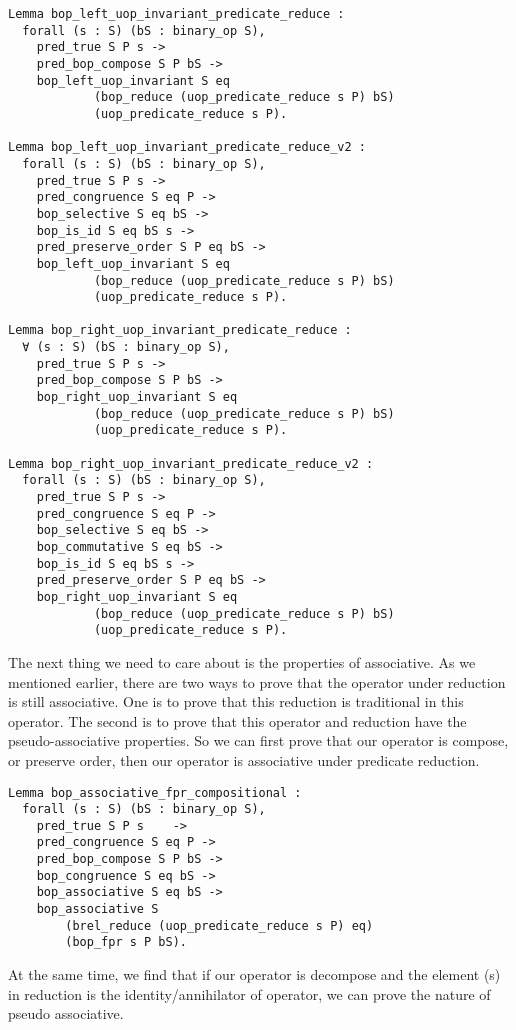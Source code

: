 \documentclass[a4paper,12pt,twoside,openright]{report}
\begin{document}
\begin{lstlisting}
Lemma bop_left_uop_invariant_predicate_reduce :
  forall (s : S) (bS : binary_op S),
    pred_true S P s -> 
    pred_bop_compose S P bS ->
    bop_left_uop_invariant S eq 
    		(bop_reduce (uop_predicate_reduce s P) bS) 
    		(uop_predicate_reduce s P).
         
Lemma bop_left_uop_invariant_predicate_reduce_v2 :
  forall (s : S) (bS : binary_op S),
    pred_true S P s ->
    pred_congruence S eq P -> 
    bop_selective S eq bS ->
    bop_is_id S eq bS s ->        
    pred_preserve_order S P eq bS ->
    bop_left_uop_invariant S eq 
    		(bop_reduce (uop_predicate_reduce s P) bS) 
    		(uop_predicate_reduce s P).

Lemma bop_right_uop_invariant_predicate_reduce :
  ∀ (s : S) (bS : binary_op S),
    pred_true S P s -> 
    pred_bop_compose S P bS ->    
    bop_right_uop_invariant S eq 
    		(bop_reduce (uop_predicate_reduce s P) bS) 
    		(uop_predicate_reduce s P).
        
Lemma bop_right_uop_invariant_predicate_reduce_v2 :
  forall (s : S) (bS : binary_op S),
    pred_true S P s ->
    pred_congruence S eq P -> 
    bop_selective S eq bS ->
    bop_commutative S eq bS ->
    bop_is_id S eq bS s ->        
    pred_preserve_order S P eq bS ->
    bop_right_uop_invariant S eq 
    		(bop_reduce (uop_predicate_reduce s P) bS) 
    		(uop_predicate_reduce s P).
\end{lstlisting}
The next thing we need to care about is the properties of associative.
As we mentioned earlier, there are two ways to prove that the operator under reduction is still associative. One is to prove that this reduction is traditional in this operator. The second is to prove that this operator and reduction have the pseudo-associative properties.
So we can first prove that our operator is compose, or preserve order, then our operator is associative under predicate reduction.
\begin{lstlisting}
Lemma bop_associative_fpr_compositional :
  forall (s : S) (bS : binary_op S),
    pred_true S P s    -> 
    pred_congruence S eq P ->     
    pred_bop_compose S P bS ->
    bop_congruence S eq bS ->         
    bop_associative S eq bS ->
    bop_associative S 
        (brel_reduce (uop_predicate_reduce s P) eq) 
        (bop_fpr s P bS).
\end{lstlisting}
At the same time, we find that if our operator is decompose and the element (s) in reduction is the identity/annihilator of operator, we can prove the nature of pseudo associative.
\end{document}
